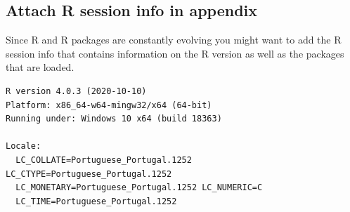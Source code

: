 \documentclass[
  11pt,
]{scrartcl}
\begin{document}
\hypertarget{sec:rsessioninfo}{%
\subsection{Attach R session info in appendix}\label{sec:rsessioninfo}}

Since R and R packages are constantly evolving you might want to add the R session info that contains information on the R version as well as the packages that are loaded.

\begin{verbatim}
R version 4.0.3 (2020-10-10)
Platform: x86_64-w64-mingw32/x64 (64-bit)
Running under: Windows 10 x64 (build 18363)

Locale:
  LC_COLLATE=Portuguese_Portugal.1252  LC_CTYPE=Portuguese_Portugal.1252   
  LC_MONETARY=Portuguese_Portugal.1252 LC_NUMERIC=C                        
  LC_TIME=Portuguese_Portugal.1252    


\end{verbatim}
\end{document}
